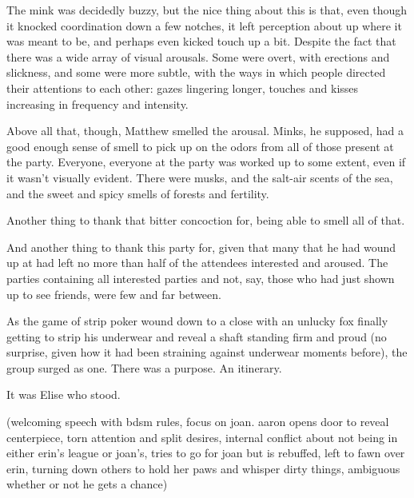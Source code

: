 The mink was decidedly buzzy, but the nice thing about this is that,
even though it knocked coordination down a few notches, it left
perception about up where it was meant to be, and perhaps even kicked
touch up a bit. Despite the fact that there was a wide array of visual
arousals. Some were overt, with erections and slickness, and some were
more subtle, with the ways in which people directed their attentions to
each other: gazes lingering longer, touches and kisses increasing in
frequency and intensity.

Above all that, though, Matthew smelled the arousal. Minks, he supposed,
had a good enough sense of smell to pick up on the odors from all of
those present at the party. Everyone, everyone at the party was worked
up to some extent, even if it wasn't visually evident. There were musks,
and the salt-air scents of the sea, and the sweet and spicy smells of
forests and fertility.

Another thing to thank that bitter concoction for, being able to smell
all of that.

And another thing to thank this party for, given that many that he had
wound up at had left no more than half of the attendees interested and
aroused. The parties containing all interested parties and not, say,
those who had just shown up to see friends, were few and far between.

As the game of strip poker wound down to a close with an unlucky fox
finally getting to strip his underwear and reveal a shaft standing firm
and proud (no surprise, given how it had been straining against
underwear moments before), the group surged as one. There was a purpose.
An itinerary.

It was Elise who stood.

(welcoming speech with bdsm rules, focus on joan. aaron opens door to
reveal centerpiece, torn attention and split desires, internal conflict
about not being in either erin's league or joan's, tries to go for joan
but is rebuffed, left to fawn over erin, turning down others to hold her
paws and whisper dirty things, ambiguous whether or not he gets a
chance)
